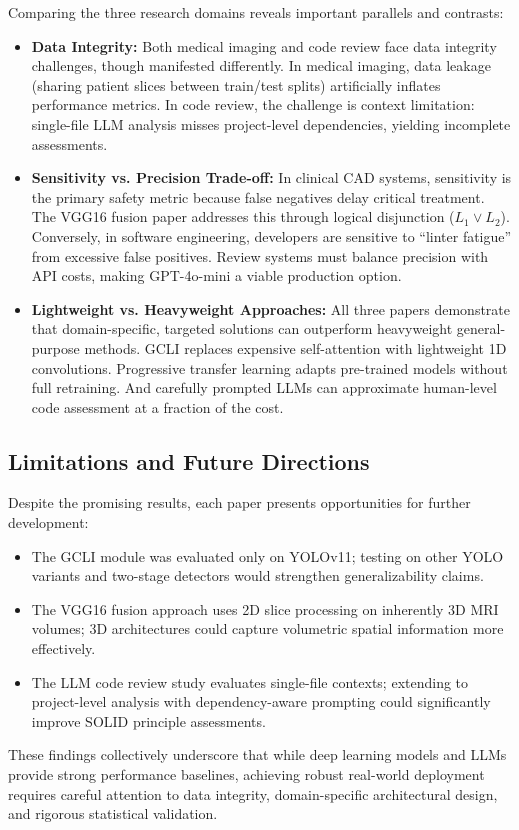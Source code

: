 Comparing the three research domains reveals important parallels and contrasts:
\begin{itemize}
    \item \textbf{Data Integrity:} Both medical imaging and code review face data integrity challenges, though manifested differently. In medical imaging, data leakage (sharing patient slices between train/test splits) artificially inflates performance metrics. In code review, the challenge is context limitation: single-file LLM analysis misses project-level dependencies, yielding incomplete assessments.

    \item \textbf{Sensitivity vs. Precision Trade-off:} In clinical CAD systems, sensitivity is the primary safety metric because false negatives delay critical treatment. The VGG16 fusion paper addresses this through logical disjunction ($L_1 \lor L_2$). Conversely, in software engineering, developers are sensitive to ``linter fatigue'' from excessive false positives. Review systems must balance precision with API costs, making GPT-4o-mini a viable production option.

    \item \textbf{Lightweight vs. Heavyweight Approaches:} All three papers demonstrate that domain-specific, targeted solutions can outperform heavyweight general-purpose methods. GCLI replaces expensive self-attention with lightweight 1D convolutions. Progressive transfer learning adapts pre-trained models without full retraining. And carefully prompted LLMs can approximate human-level code assessment at a fraction of the cost.
\end{itemize}

\subsection{Limitations and Future Directions}
Despite the promising results, each paper presents opportunities for further development:
\begin{itemize}
    \item The GCLI module was evaluated only on YOLOv11; testing on other YOLO variants and two-stage detectors would strengthen generalizability claims.
    \item The VGG16 fusion approach uses 2D slice processing on inherently 3D MRI volumes; 3D architectures could capture volumetric spatial information more effectively.
    \item The LLM code review study evaluates single-file contexts; extending to project-level analysis with dependency-aware prompting could significantly improve SOLID principle assessments.
\end{itemize}

These findings collectively underscore that while deep learning models and LLMs provide strong performance baselines, achieving robust real-world deployment requires careful attention to data integrity, domain-specific architectural design, and rigorous statistical validation.
